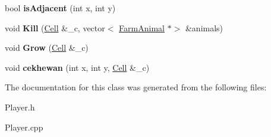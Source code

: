 \begin{DoxyCompactItemize}
\item 
\mbox{\label{classPlayer_afd521321a5e43116b18ead5398e030ce}} 
bool {\bfseries is\+Adjacent} (int x, int y)
\item 
\mbox{\label{classPlayer_a4a13bde43e869365a0725a3b948fb4b4}} 
void {\bfseries Kill} (\hyperlink{classCell}{Cell} \&\+\_\+c, vector$<$ \hyperlink{classFarmAnimal}{Farm\+Animal} $\ast$$>$ \&animals)
\item 
\mbox{\label{classPlayer_a5c1390c31e7b16bc892dad13171ba2e5}} 
void {\bfseries Grow} (\hyperlink{classCell}{Cell} \&\+\_\+c)
\item 
\mbox{\label{classPlayer_a4e9f22382954485735082502755752b9}} 
void {\bfseries cekhewan} (int x, int y, \hyperlink{classCell}{Cell} \&\+\_\+c)
\end{DoxyCompactItemize}


The documentation for this class was generated from the following files\+:\begin{DoxyCompactItemize}
\item 
Player.\+h\item 
Player.\+cpp\end{DoxyCompactItemize}
